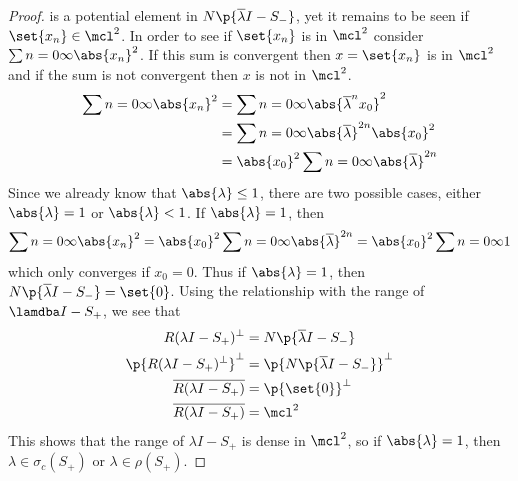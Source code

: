\documentclass[11pt, oneside]{article}
\begin{document}
\begin{enumerate}
\begin{enumerate}
\begin{proof}
          is a potential element in $N\p{\overline{\lambda}I - S_-}$, yet it
          remains to be seen if $\set{x_n} \in \mcl^2$.
          In order to see if $\set{x_n}$ is in $\mcl^2$ consider
          $\sum{n = 0}{\infty}{\abs{x_n}^2}$.
          If this sum is convergent then $x = \set{x_n}$ is in $\mcl^2$ and if
          the sum is not convergent then $x$ is not in $\mcl^2$.
          \begin{align*}
            \sum{n = 0}{\infty}{\abs{x_n}^2} &= \sum{n = 0}{\infty}{\abs{\overline{\lambda}^n x_0}^2} \\
            &= \sum{n = 0}{\infty}{\abs{\overline{\lambda}}^{2n} \abs{x_0}^2} \\
            &= \abs{x_0}^2 \sum{n = 0}{\infty}{\abs{\overline{\lambda}}^{2n}} \\
          \end{align*}
          Since we already know that $\abs{\lambda} \le 1$, there are two
          possible cases, either $\abs{\lambda} = 1$ or $\abs{\lambda} < 1$.
          If $\abs{\lambda} = 1$, then
          \[
            \sum{n = 0}{\infty}{\abs{x_n}^2} = \abs{x_0}^2 \sum{n = 0}{\infty}{\abs{\overline{\lambda}}^{2n}}
            = \abs{x_0}^2 \sum{n = 0}{\infty}{1}
          \]
          which only converges if $x_0 = 0$.
          Thus if $\abs{\lambda} = 1$, then
          $N\p{\overline{\lambda}I - S_-} = \set{0}$.
          Using the relationship with the range of $\lamdba I - S_+$, we see
          that
          \begin{align*}
            R(\lambda I - S_+)^{\perp} &= N\p{\overline{\lambda}I - S_-} \\
            \p{R(\lambda I - S_+)^{\perp}}^{\perp} &= \p{N\p{\overline{\lambda}I - S_-}}^{\perp} \\
            \overline{R(\lambda I - S_+)} &= \p{\set{0}}^{\perp} \\
            \overline{R(\lambda I - S_+)} &= \mcl^2 \\
          \end{align*}
          This shows that the range of $\lambda I - S_+$ is dense in $\mcl^2$,
          so if $\abs{\lambda} = 1$, then $\lambda \in \sigma_c(S_+)$ or
          $\lambda \in \rho(S_+)$.


\end{proof}
\end{enumerate}
\end{enumerate}
\end{document}
